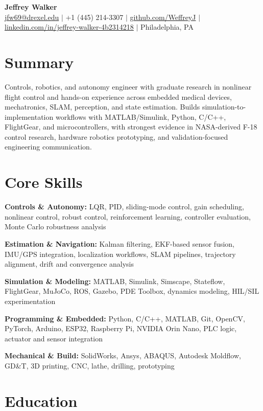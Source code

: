 \documentclass[10pt,letterpaper]{article}
\begin{document}
\begin{center}
    {\LARGE \textbf{Jeffrey Walker}}\\[0.35em]
    \href{mailto:jfw69@drexel.edu}{jfw69@drexel.edu}
    \quad $|$ \quad
    +1 (445) 214-3307
    \quad $|$ \quad
    \href{https://github.com/WeffreyJ}{github.com/WeffreyJ}
    \quad $|$ \quad
    \href{https://www.linkedin.com/in/jeffrey-walker-4b2314218/}{linkedin.com/in/jeffrey-walker-4b2314218}
    \quad $|$ \quad
    Philadelphia, PA
\end{center}

\section*{Summary}

Controls, robotics, and autonomy engineer with graduate research in nonlinear flight control and hands-on experience across embedded medical devices, mechatronics, SLAM, perception, and state estimation. Builds simulation-to-implementation workflows with MATLAB/Simulink, Python, C/C++, FlightGear, and microcontrollers, with strongest evidence in NASA-derived F-18 control research, hardware robotics prototyping, and validation-focused engineering communication.

\section{Core Skills}

\textbf{Controls \& Autonomy:} LQR, PID, sliding-mode control, gain scheduling, nonlinear control, robust control, reinforcement learning, controller evaluation, Monte Carlo robustness analysis

\textbf{Estimation \& Navigation:} Kalman filtering, EKF-based sensor fusion, IMU/GPS integration, localization workflows, SLAM pipelines, trajectory alignment, drift and convergence analysis

\textbf{Simulation \& Modeling:} MATLAB, Simulink, Simscape, Stateflow, FlightGear, MuJoCo, ROS, Gazebo, PDE Toolbox, dynamics modeling, HIL/SIL experimentation

\textbf{Programming \& Embedded:} Python, C/C++, MATLAB, Git, OpenCV, PyTorch, Arduino, ESP32, Raspberry Pi, NVIDIA Orin Nano, PLC logic, actuator and sensor integration

\textbf{Mechanical \& Build:} SolidWorks, Ansys, ABAQUS, Autodesk Moldflow, GD\&T, 3D printing, CNC, lathe, drilling, prototyping

\section{Education}
\end{document}
